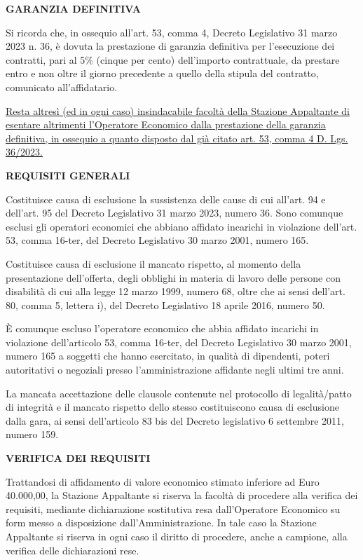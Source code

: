 \documentclass[a4paper,12pt]{letter}
\begin{document}
{\textbf{GARANZIA DEFINITIVA}

Si ricorda che, in ossequio all’art. 53, comma 4, Decreto Legislativo 31 marzo 2023 n. 36, è dovuta la prestazione di garanzia definitiva per l'esecuzione dei contratti, pari al 5\% (cinque per cento) dell'importo contrattuale, da prestare entro e non oltre il giorno precedente a quello della stipula del contratto, comunicato all’affidatario.

\underline{Resta altresì (ed in ogni caso) insindacabile facoltà della Stazione Appaltante di esentare altrimenti l’Operatore Economico dalla prestazione della garanzia definitiva, in ossequio a quanto disposto dal già citato art. 53, comma 4 D. Lgs. 36/2023.}

\textbf{REQUISITI GENERALI}

Costituisce causa di esclusione la sussistenza delle cause di cui all’art. 94 e dell’art. 95 del Decreto Legislativo 31 marzo 2023, numero 36. Sono comunque esclusi gli operatori economici che abbiano affidato incarichi in violazione dell’art. 53, comma 16-ter, del Decreto Legislativo 30 marzo 2001, numero 165. 

Costituisce causa di esclusione il mancato rispetto, al momento della presentazione dell'offerta, degli obblighi in materia di lavoro delle persone con disabilità di cui alla legge 12 marzo 1999, numero 68, oltre che ai sensi dell’art. 80, comma 5, lettera i), del Decreto Legislativo 18 aprile 2016, numero 50. 

È comunque escluso l’operatore economico che abbia affidato incarichi in violazione dell’articolo 53, comma 16-ter, del Decreto Legislativo 30 marzo 2001, numero 165 a soggetti che hanno esercitato, in qualità di dipendenti, poteri autoritativi o negoziali presso l’amministrazione affidante negli ultimi tre anni. 

La mancata accettazione delle clausole contenute nel protocollo di legalità/patto di integrità e il mancato rispetto dello stesso costituiscono causa di esclusione dalla gara, ai sensi dell’articolo 83 bis del Decreto legislativo 6 settembre 2011, numero 159.

\textbf{VERIFICA DEI REQUISITI}

Trattandosi di affidamento di valore economico stimato inferiore ad Euro 40.000,00, la Stazione Appaltante si riserva la facoltà di procedere alla verifica dei requisiti, mediante dichiarazione sostitutiva resa dall’Operatore Economico su form messo a disposizione dall’Amministrazione. In tale caso la Stazione Appaltante si riserva in ogni caso il diritto di procedere, anche a campione, alla verifica delle dichiarazioni rese.

}
\end{document}
